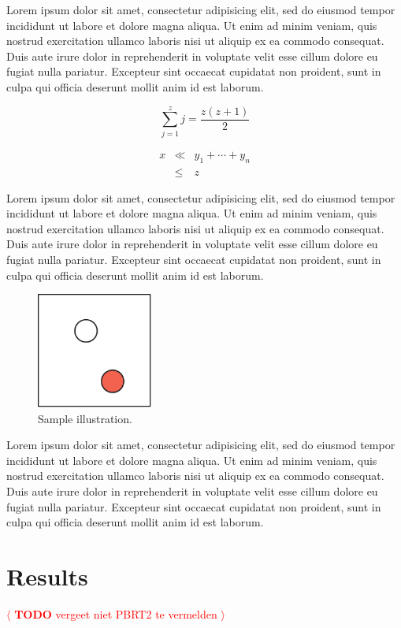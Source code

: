 \documentclass[review]{acmsiggraph}
\newcommand{\todo}[1]{\textcolor{red}{\(\langle\) \textbf{TODO} #1 \(\rangle\) }}
\begin{document}
Lorem ipsum dolor sit amet, consectetur adipisicing elit, sed do
eiusmod tempor incididunt ut labore et dolore magna aliqua. Ut enim ad
minim veniam, quis nostrud exercitation ullamco laboris nisi ut
aliquip ex ea commodo consequat. Duis aute irure dolor in
reprehenderit in voluptate velit esse cillum dolore eu fugiat nulla
pariatur. Excepteur sint occaecat cupidatat non proident, sunt in
culpa qui officia deserunt mollit anim id est laborum.

\begin{equation}
 \sum_{j=1}^{z} j = \frac{z(z+1)}{2}
\end{equation}

\begin{eqnarray}
x & \ll & y_{1} + \cdots + y_{n} \\
  & \leq & z
\end{eqnarray}

Lorem ipsum dolor sit amet, consectetur adipisicing elit, sed do
eiusmod tempor incididunt ut labore et dolore magna aliqua. Ut enim ad
minim veniam, quis nostrud exercitation ullamco laboris nisi ut
aliquip ex ea commodo consequat. Duis aute irure dolor in
reprehenderit in voluptate velit esse cillum dolore eu fugiat nulla
pariatur. Excepteur sint occaecat cupidatat non proident, sunt in
culpa qui officia deserunt mollit anim id est laborum.
\begin{figure}[ht]
  \centering
  \includegraphics[width=1.5in]{images/samplefigure}
  \caption{Sample illustration.}
\end{figure}
Lorem ipsum dolor sit amet, consectetur adipisicing elit, sed do
eiusmod tempor incididunt ut labore et dolore magna aliqua. Ut enim ad
minim veniam, quis nostrud exercitation ullamco laboris nisi ut
aliquip ex ea commodo consequat. Duis aute irure dolor in
reprehenderit in voluptate velit esse cillum dolore eu fugiat nulla
pariatur. Excepteur sint occaecat cupidatat non proident, sunt in
culpa qui officia deserunt mollit anim id est laborum.

\section{Results}
\todo{vergeet niet PBRT2 te vermelden}
\end{document}
